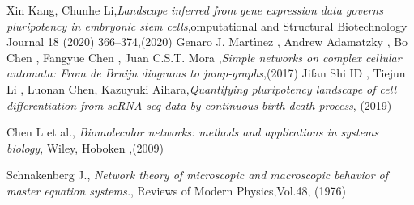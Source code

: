 \begin{thebibliography}{90}
 Xin Kang, Chunhe Li,\emph{Landscape inferred from gene expression data governs pluripotency in
embryonic stem cells},omputational and Structural Biotechnology Journal 18 (2020) 366–374,(2020)
 Genaro J. Martı́nez , Andrew Adamatzky  ,
Bo Chen , Fangyue Chen , Juan C.S.T. Mora ,\emph{Simple networks on complex cellular automata:
From de Bruijn diagrams to jump-graphs},(2017)
 Jifan Shi ID  , Tiejun Li , Luonan Chen, Kazuyuki Aihara,\emph{Quantifying pluripotency landscape of cell
differentiation from scRNA-seq data by
continuous birth-death process}, (2019)


 Chen L et al., \emph{Biomolecular networks: methods and applications in systems biology}, Wiley, Hoboken ,(2009)

 Schnakenberg J., \emph{Network theory of microscopic and macroscopic behavior of master equation systems.}, Reviews of Modern Physics,Vol.48, (1976)




\end{thebibliography}
\clearpage{\pagestyle{empty}\cleardoublepage}


